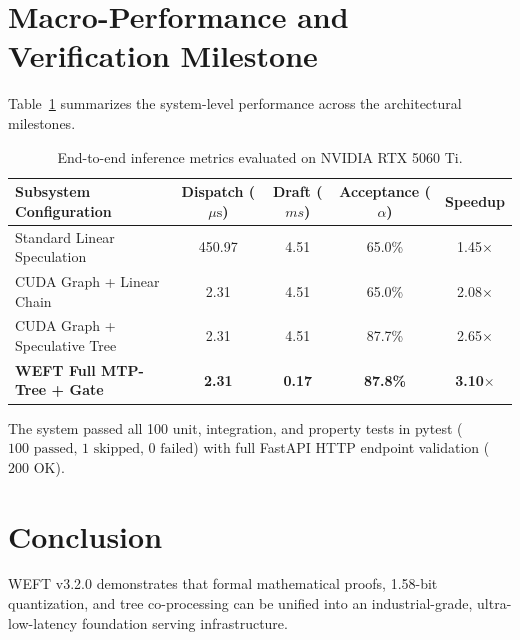 \documentclass[11pt,a4paper]{article}
\begin{document}
\section{Macro-Performance and Verification Milestone}
Table~\ref{tab:macro_perf} summarizes the system-level performance across the architectural milestones.

\begin{table}[h]
\centering
\begin{tabular}{lcccc}
\toprule
\textbf{Subsystem Configuration} & \textbf{Dispatch ($\mu\text{s}$)} & \textbf{Draft ($ms$)} & \textbf{Acceptance ($\alpha$)} & \textbf{Speedup} \\
\midrule
Standard Linear Speculation & 450.97 & 4.51 & 65.0\% & 1.45$\times$ \\
CUDA Graph + Linear Chain & 2.31 & 4.51 & 65.0\% & 2.08$\times$ \\
CUDA Graph + Speculative Tree & 2.31 & 4.51 & 87.7\% & 2.65$\times$ \\
\textbf{WEFT Full MTP-Tree + Gate} & \textbf{2.31} & \textbf{0.17} & \textbf{87.8\%} & \textbf{3.10$\times$} \\
\bottomrule
\end{tabular}
\caption{End-to-end inference metrics evaluated on NVIDIA RTX 5060 Ti.}
\label{tab:macro_perf}
\end{table}

The system passed all 100 unit, integration, and property tests in pytest ($100\text{ passed, } 1\text{ skipped, } 0\text{ failed}$) with full FastAPI HTTP endpoint validation ($200\text{ OK}$).

\section{Conclusion}
WEFT v3.2.0 demonstrates that formal mathematical proofs, 1.58-bit quantization, and tree co-processing can be unified into an industrial-grade, ultra-low-latency foundation serving infrastructure.
\end{document}
